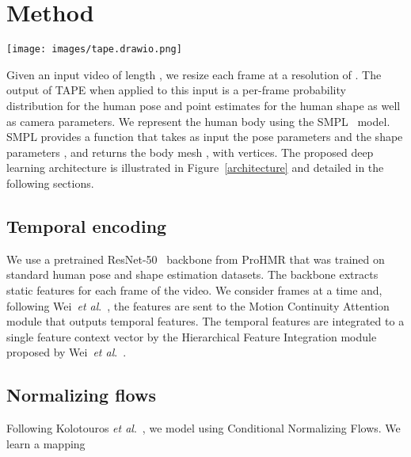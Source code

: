 \documentclass[runningheads]{llncs}
\newcommand{\etal}{\textit{et al}.}
\begin{document}
\section{Method}
\begin{figure*}[t]
    \centering
    \texttt{[image: images/tape.drawio.png]}
    \caption{TAPE architecture: We extract static ResNet-50 features from video which are used as input for the Temporal Encoder (MoCA). MoCA outputs temporal features, and the HAFI module integrates them to a single feature, the hidden vector , which is used as the conditioning input to the flow model. In parallel, it is also decoded to shape parameters  and camera parameters . Our flow model learns an invertible mapping which allows for two processing directions; depending on the desired function, we can perform both sampling and fast likelihood computation.}
    \label{architecture}
\end{figure*}

Given an input video  of length , we resize each frame at a resolution of . The output of TAPE when applied to this input is a per-frame probability distribution for the human pose and point estimates for the human shape as well as camera parameters. We represent the human body using the SMPL~\cite{SMPL:2015} model. 
SMPL provides a function
 that takes as input the pose parameters  and the
shape parameters , and returns the body mesh ,
with  vertices.
The proposed deep learning architecture is illustrated in Figure~\ref{architecture} and detailed in the following sections. 

\subsection{Temporal encoding}
\label{sec:temporalencoder}
We use a pretrained ResNet-50~\cite{7780459} backbone from ProHMR that was trained on standard human pose and shape estimation datasets. The backbone extracts static features for each frame of the video. We consider  frames at a time and, following Wei~\etal~\cite{WeiLin2022mpsnet}, 
the features are sent to the Motion Continuity Attention module that outputs  temporal features. The  temporal features are integrated to a single feature context vector  by the Hierarchical Feature Integration module proposed by Wei~\etal~\cite{WeiLin2022mpsnet}.



\subsection{Normalizing flows}
Following Kolotouros \etal~\cite{kolotouros2021prohmr},
we model 
using Conditional Normalizing Flows. We learn a mapping
\end{document}
